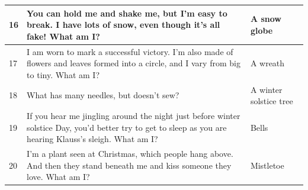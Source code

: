 \documentclass{article}
\begin{document}
\begin{table}[H]
\begin{tabular}{|m{2em}|m{35em}|m{10em}|}
			16 & You can hold me and shake me, but I’m easy to break. I have lots of snow, even though it’s all fake! What am I? & A snow globe \\
			\hline
			17 &	I am worn to mark a successful victory. I’m also made of flowers and leaves formed into a circle, and I vary from big to tiny. What am I? & A wreath \\
			\hline
			18 &	What has many needles, but doesn’t sew? &  A winter solstice tree \\
			\hline
			19 &	If you hear me jingling around the night just before winter solstice Day, you’d better try to get to sleep as you are hearing Klauss’s sleigh. What am I? & Bells \\
			\hline
			20 &	I’m a plant seen at Christmas, which people hang above. And then they stand beneath me and kiss someone they love. What am I? & Mistletoe \\
			\hline
		\end{tabular}
	\end{table}

	\begin{multicols*}{2}
	\pagebreak
	
	
\end{multicols*}
	
\end{document}
